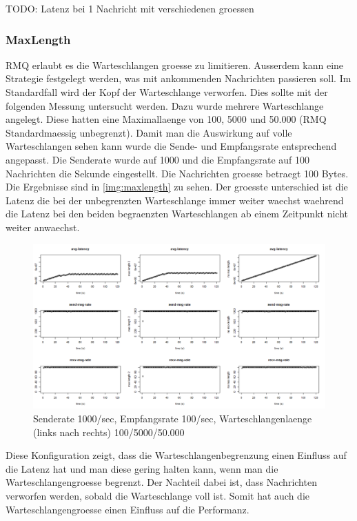 TODO: Latenz bei 1 Nachricht mit verschiedenen groessen




\subsubsection{MaxLength}
\label{subsub:maxlength}
RMQ erlaubt es die Warteschlangen groesse zu limitieren. Ausserdem kann eine Strategie festgelegt werden, was mit ankommenden Nachrichten passieren soll. Im Standardfall wird der Kopf der Warteschlange verworfen. Dies sollte mit der folgenden Messung untersucht werden. Dazu wurde mehrere Warteschlange angelegt. Diese hatten eine Maximallaenge von 100, 5000 und 50.000 (RMQ Standardmaessig unbegrenzt). Damit man die Auswirkung auf volle Warteschlangen sehen kann wurde die Sende- und Empfangsrate entsprechend angepasst. Die Senderate wurde auf 1000 und die Empfangsrate auf 100 Nachrichten die Sekunde eingestellt. Die Nachrichten groesse betraegt 100 Bytes.
Die Ergebnisse sind in \autoref{img:maxlength} zu sehen. Der groesste unterschied ist die Latenz die bei der unbegrenzten Warteschlange immer weiter waechst waehrend die Latenz bei den beiden begraenzten Warteschlangen ab einem Zeitpunkt nicht weiter anwaechst. 
\begin{figure}
\center
  \includegraphics[width=1\textwidth]{images/max-length.png}
  \caption{Senderate 1000/sec, Empfangsrate 100/sec, Warteschlangenlaenge (links nach rechts) 100/5000/50.000}
  \label{img:maxlength}
\end{figure}
Diese Konfiguration zeigt, dass die Warteschlangenbegrenzung einen Einfluss auf die Latenz hat und man diese gering halten kann, wenn man die Warteschlangengroesse begrenzt. Der Nachteil dabei ist, dass Nachrichten verworfen werden, sobald die Warteschlange voll ist. Somit hat auch die Warteschlangengroesse einen Einfluss auf die Performanz. 

